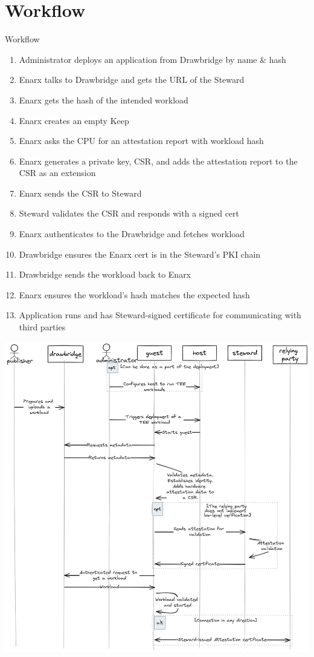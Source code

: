 \documentclass[graphics,compress]{beamer}
\begin{document}
\section{Workflow}
\begin{frame}{Workflow}
     {
        \begin{enumerate}
            \item Administrator deploys an application from Drawbridge by name \& hash
            \item Enarx talks to Drawbridge and gets the URL of the Steward
            \item Enarx gets the hash of the intended workload
            \item Enarx creates an empty Keep
            \item Enarx asks the CPU for an attestation report with workload hash
            \item Enarx generates a private key, CSR, and adds the attestation report to the CSR as an extension
            \item Enarx sends the CSR to Steward
            \item Steward validates the CSR and responds with a signed cert
            \item Enarx authenticates to the Drawbridge and fetches workload
            \item Drawbridge ensures the Enarx cert is in the Steward's PKI chain
            \item Drawbridge sends the workload back to Enarx
            \item Enarx ensures the workload's hash matches the expected hash
            \item Application runs and has Steward-signed certificate for communicating with third parties
        \end{enumerate}
    }
     {
        \centering
        \includegraphics[width=1.01\linewidth,height=0.71\linewidth]{images/attestation-flow-excalidraw.png}
    }
\end{frame}
\end{document}
